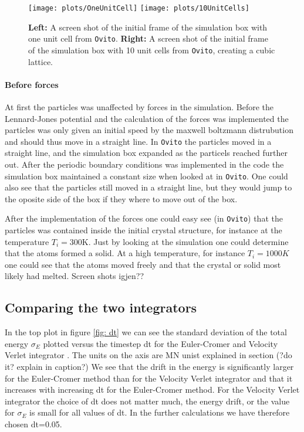 \documentclass[11pt,a4wide]{article}
\begin{document}
\begin{figure}[htp]
\centering
\texttt{[image: plots/OneUnitCell]}
\texttt{[image: plots/10UnitCells]}
\caption{\textbf{Left:} A screen shot of the initial frame of the simulation box with one unit cell from \texttt{Ovito}. \textbf{Right:} A screen shot of the initial frame of the simulation box with 10 unit cells from \texttt{Ovito}, creating a cubic lattice.}
\label{fig: unitCellsOvito}
\end{figure}

\paragraph{Before forces}
At first the particles was unaffected by forces in the simulation. Before the Lennard-Jones potential and the calculation of the forces was implemented the particles was only given an initial speed by the maxwell boltzmann distrubution and should thus move in a straight line. In \texttt{Ovito} the particles moved in a straight line, and the simulation box expanded as the particels reached further out. After the periodic boundary conditions was implemented in the code the simulation box maintained a constant size when looked at in \texttt{Ovito}. One could also see that the particles still moved in a straight line, but they would jump to the oposite side of the box if they where to move out of the box. 

After the implementation of the forces one could easy see (in \texttt{Ovito}) that the particles was contained inside the initial crystal structure, for instance at the temperature $T_i =300$K. Just by looking at the simulation one could determine that the atoms formed a solid. At a high temperature, for instance $T_i = 1000K$ one could see that the atoms moved freely and that the crystal or solid most likely had melted. Screen shots igjen??


\subsection{Comparing the two integrators} \label{sec: integrators_results}

In the top plot in figure \ref{fig: dt} we can see the standard deviation of the total energy $\sigma_E$ plotted versus the timestep dt for the Euler-Cromer and Velocity Verlet integrator . The units on the axis are MN unist explained in section (?do it? explain in caption?) We see that the drift in the energy is significantly larger for the Euler-Cromer method than for the Velocity Verlet integrator and that it increases with increasing dt for the Euler-Cromer method. For the Velocity Verlet integrator the choice of dt does not matter much, the energy drift, or the value for $\sigma_E$ is small for all values of dt. In the further calculations we have therefore chosen dt=0.05.  
\end{document}
